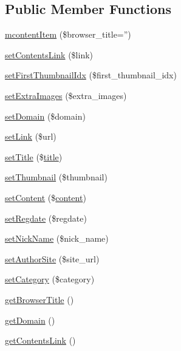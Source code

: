 \subsection*{Public Member Functions}
\begin{DoxyCompactItemize}
\item 
\hyperlink{classmcontentItem_a9cf9b439a6c29b1354b298ab6023ea3e}{mcontent\+Item} (\$browser\+\_\+title='')
\item 
\hyperlink{classmcontentItem_a8d8267fc8c63ad032d8dfa694b54d30b}{set\+Contents\+Link} (\$link)
\item 
\hyperlink{classmcontentItem_a97b29510d9386112296071cb06bd68dd}{set\+First\+Thumbnail\+Idx} (\$first\+\_\+thumbnail\+\_\+idx)
\item 
\hyperlink{classmcontentItem_a9907cf978c2b2dafbaeb307faea0874d}{set\+Extra\+Images} (\$extra\+\_\+images)
\item 
\hyperlink{classmcontentItem_adaf816a617e10b21c1b7cfa3080e4a25}{set\+Domain} (\$domain)
\item 
\hyperlink{classmcontentItem_a6c192aee58d7bca3d8933d387309b2ab}{set\+Link} (\$url)
\item 
\hyperlink{classmcontentItem_adb687bee610481753feb8bdd14fab049}{set\+Title} (\$\hyperlink{ko_8install_8php_a5b072c5fd1d2228c6ba5cee13cd142e3}{title})
\item 
\hyperlink{classmcontentItem_a956c763f26136b4e7a96ab07c04a1957}{set\+Thumbnail} (\$thumbnail)
\item 
\hyperlink{classmcontentItem_afb9763a013942bd40ab5a3b1c7491910}{set\+Content} (\$\hyperlink{classcontent}{content})
\item 
\hyperlink{classmcontentItem_aeb646f2283bfb0a13b7d9f544058f962}{set\+Regdate} (\$regdate)
\item 
\hyperlink{classmcontentItem_a4b702963538643aac56d9a3312a06bee}{set\+Nick\+Name} (\$nick\+\_\+name)
\item 
\hyperlink{classmcontentItem_adaa9ad60dd8f5373b9f2258a6effe70c}{set\+Author\+Site} (\$site\+\_\+url)
\item 
\hyperlink{classmcontentItem_a004c63ef8da549d29d201b4946372c5e}{set\+Category} (\$category)
\item 
\hyperlink{classmcontentItem_a6fe964acc2f33039f90a6ed33ae03ba9}{get\+Browser\+Title} ()
\item 
\hyperlink{classmcontentItem_a29a4fb4f4bedd748ec93238be37a22fb}{get\+Domain} ()
\item 
\hyperlink{classmcontentItem_a60fe1f5cbd47314c2910a8782a3252a9}{get\+Contents\+Link} ()

\end{DoxyCompactItemize}
